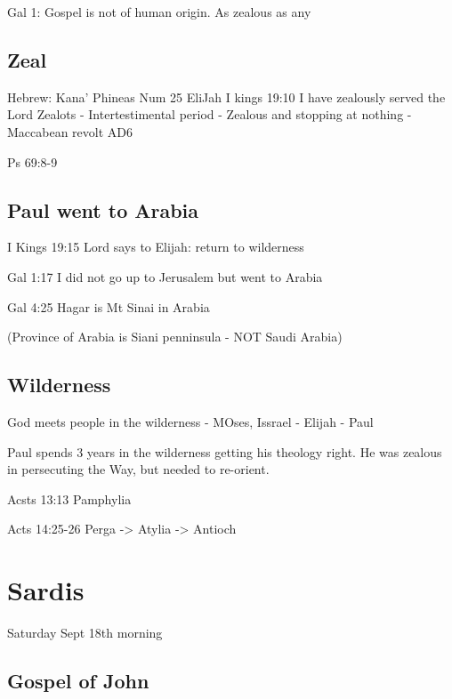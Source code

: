 \documentclass[
]{book}
\begin{document}
Gal 1: Gospel is not of human origin. As zealous as any

\hypertarget{zeal}{%
\section{Zeal}\label{zeal}}

Hebrew: Kana'
Phineas
Num 25
EliJah
I kings 19:10 I have zealously served the Lord
Zealots - Intertestimental period
- Zealous and stopping at nothing
- Maccabean revolt AD6

Ps 69:8-9

\hypertarget{paul-went-to-arabia}{%
\section{Paul went to Arabia}\label{paul-went-to-arabia}}

I Kings 19:15 Lord says to Elijah: return to wilderness

Gal 1:17 I did not go up to Jerusalem but went to Arabia

Gal 4:25 Hagar is Mt Sinai in Arabia

(Province of Arabia is Siani penninsula - NOT Saudi Arabia)

\hypertarget{wilderness}{%
\section{Wilderness}\label{wilderness}}

God meets people in the wilderness - MOses, Issrael - Elijah - Paul

Paul spends 3 years in the wilderness getting his theology right. He was zealous in persecuting the Way, but needed to re-orient.

Acsts 13:13 Pamphylia

Acts 14:25-26 Perga -\textgreater{} Atylia -\textgreater{} Antioch

\hypertarget{sardis}{%
\chapter{Sardis}\label{sardis}}

Saturday Sept 18th morning

\hypertarget{gospel-of-john}{%
\section{Gospel of John}\label{gospel-of-john}}
\end{document}
